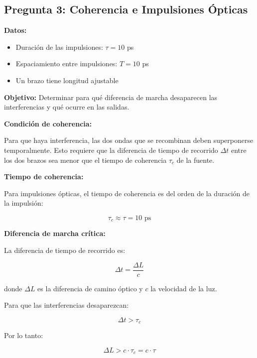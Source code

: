 \documentclass[12pt,a4paper]{article}
\begin{document}
\subsection{Pregunta 3: Coherencia e Impulsiones Ópticas}

\textbf{Datos:}
\begin{itemize}
    \item Duración de las impulsiones: $\tau = 10$ ps
    \item Espaciamiento entre impulsiones: $T = 10$ ps
    \item Un brazo tiene longitud ajustable
\end{itemize}

\textbf{Objetivo:} Determinar para qué diferencia de marcha desaparecen las interferencias y qué ocurre en las salidas.

\textbf{Condición de coherencia:}

Para que haya interferencia, las dos ondas que se recombinan deben superponerse temporalmente. Esto requiere que la diferencia de tiempo de recorrido $\Delta t$ entre los dos brazos sea menor que el tiempo de coherencia $\tau_c$ de la fuente.

\textbf{Tiempo de coherencia:}

Para impulsiones ópticas, el tiempo de coherencia es del orden de la duración de la impulsión:

\begin{equation}
    \tau_c \approx \tau = 10 \text{ ps}
\end{equation}

\textbf{Diferencia de marcha crítica:}

La diferencia de tiempo de recorrido es:

\begin{equation}
    \Delta t = \frac{\Delta L}{c}
\end{equation}

donde $\Delta L$ es la diferencia de camino óptico y $c$ la velocidad de la luz.

Para que las interferencias desaparezcan:

\begin{equation}
    \Delta t > \tau_c
\end{equation}

Por lo tanto:

\begin{equation}
    \Delta L > c \cdot \tau_c = c \cdot \tau
\end{equation}
\end{document}
